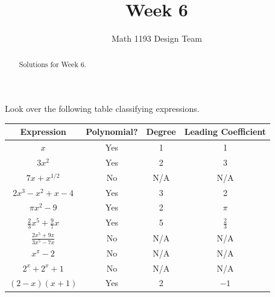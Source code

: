 \documentclass[noauthor]{ximera}
\title{Week 6}
\author{Math 1193 Design Team}
\begin{document}
\begin{abstract}
    Solutions for Week 6.
\end{abstract}
\maketitle

\begin{problem}
Look over the following table classifying expressions.

\begin{center}
\begin{tabular}{|c|c|c|c|} 
 \hline
 Expression & Polynomial? & Degree & Leading Coefficient \\
 \hline\hline
 \(x\) & Yes & 1 & 1 \\ 
 \hline
 \(3x^2\) & Yes & 2 & 3 \\
 \hline
 \(7x + x^{1/2}\) & No & N/A & N/A \\
 \hline
 \(2x^3 - x^2 + x - 4\) & Yes & 3 & 2 \\
 \hline
 \(\pi x^2 - 9\) & Yes & 2 & \(\pi\) \\
 \hline
 \(\frac{2}{3}x^5 + \frac{9}{7}x\) & Yes & 5 & \(\frac{2}{3}\) \\
 \hline
 \(\frac{2x^5 + 9x}{3x^5 - 7x}\) & No & N/A & N/A \\
 \hline
 \(x^\pi - 2\) & No & N/A & N/A \\
 \hline
 \(2^x + 2^x + 1\) & No & N/A & N/A \\
 \hline
 \((2 - x)(x + 1)\) & Yes & 2 & \(-1\) \\
 \hline
\end{tabular}
\end{center}


\end{problem}
\end{document}
